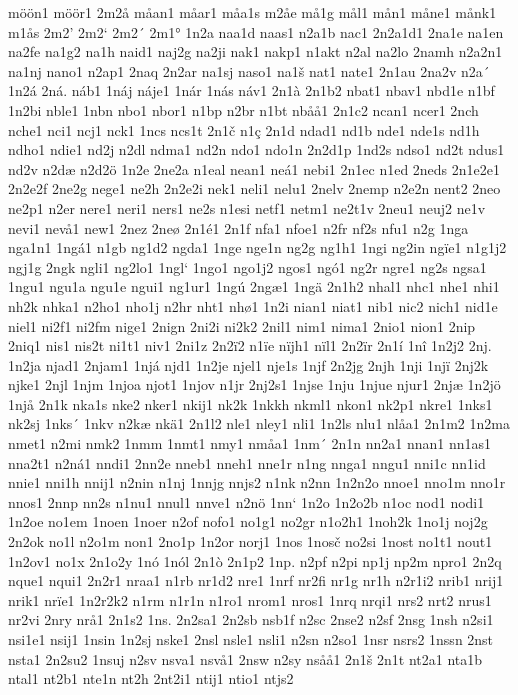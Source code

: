 möön1
möör1
2m2å
måan1
måar1
måa1s
m2åe
må1g
mål1
mån1
måne1
månk1
m1ås
2m2'
2m2`
2m2´
2m1°
1n2a
naa1d
naas1
n2a1b
nac1
2n2a1d1
2na1e
na1en
na2fe
na1g2
na1h
naid1
naj2g
na2ji
nak1
nakp1
n1akt
n2al
na2lo
2namh
n2a2n1
na1nj
nano1
n2ap1
2naq
2n2ar
na1sj
naso1
na1š
nat1
nate1
2n1au
2na2v
n2a´
1n2á
2ná.
náb1
1náj
náje1
1nár
1nás
náv1
2n1à
2n1b2
nbat1
nbav1
nbd1e
n1bf
1n2bi
nble1
1nbn
nbo1
nbor1
n1bp
n2br
n1bt
nbåå1
2n1c2
ncan1
ncer1
2nch
nche1
nci1
ncj1
nck1
1ncs
ncs1t
2n1č
n1ç
2n1d
ndad1
nd1b
nde1
nde1s
nd1h
ndho1
ndie1
nd2j
n2dl
ndma1
nd2n
ndo1
ndo1n
2n2d1p
1nd2s
ndso1
nd2t
ndus1
nd2v
n2dæ
n2d2ö
1n2e
2ne2a
n1eal
nean1
neá1
nebi1
2n1ec
n1ed
2neds
2n1e2e1
2n2e2f
2ne2g
nege1
ne2h
2n2e2i
nek1
neli1
nelu1
2nelv
2nemp
n2e2n
nent2
2neo
ne2p1
n2er
nere1
neri1
ners1
ne2s
n1esi
netf1
netm1
ne2t1v
2neu1
neuj2
ne1v
nevi1
nevå1
new1
2nez
2neø
2n1é1
2n1f
nfa1
nfoe1
n2fr
nf2s
nfu1
n2g
1nga
nga1n1
1ngá1
n1gb
ng1d2
ngda1
1nge
nge1n
ng2g
ng1h1
1ngi
ng2in
ngïe1
n1g1j2
ngj1g
2ngk
ngli1
ng2lo1
1ngl`
1ngo1
ngo1j2
ngos1
ngó1
ng2r
ngre1
ng2s
ngsa1
1ngu1
ngu1a
ngu1e
ngui1
ng1ur1
1ngú
2ngæ1
1ngä
2n1h2
nhal1
nhc1
nhe1
nhi1
nh2k
nhka1
n2ho1
nho1j
n2hr
nht1
nhø1
1n2i
nian1
niat1
nib1
nic2
nich1
nid1e
niel1
ni2f1
ni2fm
nige1
2nign
2ni2i
ni2k2
2nil1
nim1
nima1
2nio1
nion1
2nip
2niq1
nis1
nis2t
ni1t1
niv1
2ni1z
2n2ï2
n1ïe
nïjh1
nïl1
2n2ïr
2n1í
1nî
1n2j2
2nj.
1n2ja
njad1
2njam1
1njá
njd1
1n2je
njel1
nje1s
1njf
2n2jg
2njh
1nji
1njï
2nj2k
njke1
2njl
1njm
1njoa
njot1
1njov
n1jr
2nj2s1
1njse
1nju
1njue
njur1
2njæ
1n2jö
1njå
2n1k
nka1s
nke2
nker1
nkij1
nk2k
1nkkh
nkml1
nkon1
nk2p1
nkre1
1nks1
nk2sj
1nks´
1nkv
n2kæ
nkä1
2n1l2
nle1
nley1
nli1
1n2ls
nlu1
nlåa1
2n1m2
1n2ma
nmet1
n2mi
nmk2
1nmm
1nmt1
nmy1
nmåa1
1nm´
2n1n
nn2a1
nnan1
nn1as1
nna2t1
n2ná1
nndi1
2nn2e
nneb1
nneh1
nne1r
n1ng
nnga1
nngu1
nni1c
nn1id
nnie1
nni1h
nnij1
n2nin
n1nj
1nnjg
nnjs2
n1nk
n2nn
1n2n2o
nnoe1
nno1m
nno1r
nnos1
2nnp
nn2s
n1nu1
nnul1
nnve1
n2nö
1nn`
1n2o
1n2o2b
n1oc
nod1
nodi1
1n2oe
no1em
1noen
1noer
n2of
nofo1
no1g1
no2gr
n1o2h1
1noh2k
1no1j
noj2g
2n2ok
no1l
n2o1m
non1
2no1p
1n2or
norj1
1nos
1nosč
no2si
1nost
no1t1
nout1
1n2ov1
no1x
2n1o2y
1nó
1nól
2n1ò
2n1p2
1np.
n2pf
n2pi
np1j
np2m
npro1
2n2q
nque1
nqui1
2n2r1
nraa1
n1rb
nr1d2
nre1
1nrf
nr2fi
nr1g
nr1h
n2r1i2
nrib1
nrij1
nrik1
nrïe1
1n2r2k2
n1rm
n1r1n
n1ro1
nrom1
nros1
1nrq
nrqi1
nrs2
nrt2
nrus1
nr2vi
2nry
nrå1
2n1s2
1ns.
2n2sa1
2n2sb
nsb1f
n2sc
2nse2
n2sf
2nsg
1nsh
n2si1
nsi1e1
nsij1
1nsin
1n2sj
nske1
2nsl
nsle1
nsli1
n2sn
n2so1
1nsr
nsrs2
1nssn
2nst
nsta1
2n2su2
1nsuj
n2sv
nsva1
nsvå1
2nsw
n2sy
nsåå1
2n1š
2n1t
nt2a1
nta1b
ntal1
nt2b1
nte1n
nt2h
2nt2i1
ntij1
ntio1
ntjs2
